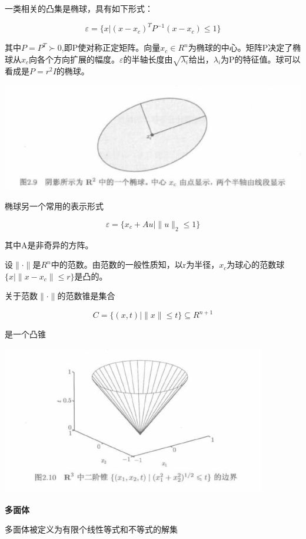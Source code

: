 \documentclass{ctexart}
\begin{document}
	一类相关的凸集是椭球，具有如下形式：
	
	\[\varepsilon = \{x|(x-x_c)^TP^{-1}(x-x_c) \leq 1\}\]
	
	其中\(P=P^T \succ 0\),即P使对称正定矩阵。向量\(x_c \in R^n\)为椭球的中心。矩阵P决定了椭球从\(x_c\)向各个方向扩展的幅度。\(\varepsilon\)的半轴长度由\(\sqrt{\lambda_i}\)给出，\(\lambda_i\)为P的特征值。球可以看成是\(P=r^2I\)的椭球。
	
	\includegraphics[width=1\linewidth]{pic/pic2_9}
	
	椭球另一个常用的表示形式
	
	\[\varepsilon = \{x_c+Au| \parallel u \parallel_2 \leq 1\}\]
	
	其中A是非奇异的方阵。
	
	设\(\parallel · \parallel\)是\(R^n\)中的范数。由范数的一般性质知，以r为半径，\(x_c\)为球心的范数球\(\{x| \parallel x-x_c\parallel \leq r\}\)是凸的。
	
	关于范数\(\parallel · \parallel\)的范数锥是集合
	
	\[C = \{(x,t)| \parallel x\parallel \leq t\} \subseteq R^{n+1}\]
	
	是一个凸锥
	
	\includegraphics[width=1\linewidth]{pic/pic2_10}
	
	\textbf{多面体}
	
	多面体被定义为有限个线性等式和不等式的解集
	
\end{document}
